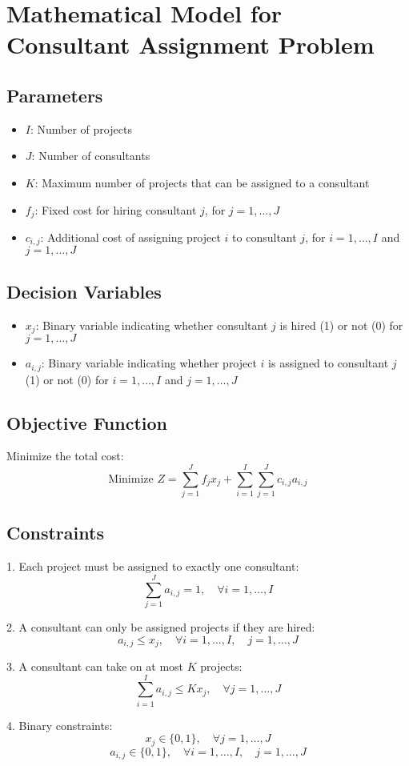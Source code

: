 \documentclass{article}
\begin{document}
\section*{Mathematical Model for Consultant Assignment Problem}

\subsection*{Parameters}
\begin{itemize}
    \item \( I \): Number of projects
    \item \( J \): Number of consultants
    \item \( K \): Maximum number of projects that can be assigned to a consultant
    \item \( f_j \): Fixed cost for hiring consultant \( j \), for \( j = 1, \ldots, J \)
    \item \( c_{i,j} \): Additional cost of assigning project \( i \) to consultant \( j \), for \( i = 1, \ldots, I \) and \( j = 1, \ldots, J \)
\end{itemize}

\subsection*{Decision Variables}
\begin{itemize}
    \item \( x_{j} \): Binary variable indicating whether consultant \( j \) is hired (1) or not (0) for \( j = 1, \ldots, J \)
    \item \( a_{i,j} \): Binary variable indicating whether project \( i \) is assigned to consultant \( j \) (1) or not (0) for \( i = 1, \ldots, I \) and \( j = 1, \ldots, J \)
\end{itemize}

\subsection*{Objective Function}
Minimize the total cost:
\[
\text{Minimize } Z = \sum_{j=1}^{J} f_j x_j + \sum_{i=1}^{I} \sum_{j=1}^{J} c_{i,j} a_{i,j}
\]

\subsection*{Constraints}
1. Each project must be assigned to exactly one consultant:
\[
\sum_{j=1}^{J} a_{i,j} = 1, \quad \forall i = 1, \ldots, I
\]

2. A consultant can only be assigned projects if they are hired:
\[
a_{i,j} \leq x_j, \quad \forall i = 1, \ldots, I, \quad j = 1, \ldots, J
\]

3. A consultant can take on at most \( K \) projects:
\[
\sum_{i=1}^{I} a_{i,j} \leq K x_j, \quad \forall j = 1, \ldots, J
\]

4. Binary constraints:
\[
x_j \in \{0, 1\}, \quad \forall j = 1, \ldots, J
\]
\[
a_{i,j} \in \{0, 1\}, \quad \forall i = 1, \ldots, I, \quad j = 1, \ldots, J
\]
\end{document}

